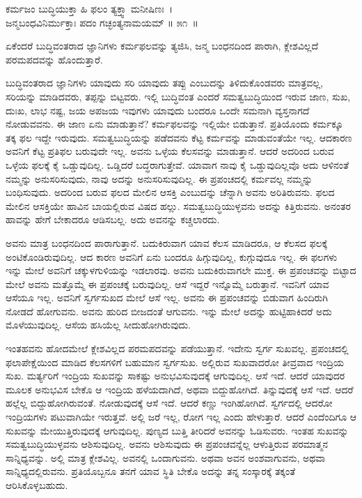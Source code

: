\begin{shloka}
ಕರ್ಮಜಂ ಬುದ್ಧಿಯುಕ್ತಾ ಹಿ ಫಲಂ ತ್ಯಕ್ತ್ವಾ ಮನೀಷಿಣಃ~।\\ಜನ್ಮಬಂಧವಿನಿರ್ಮುಕ್ತಾಃ ಪದಂ ಗಚ್ಛಂತ್ಯನಾಮಯಮ್ \hfill॥ ೫೧~॥
\end{shloka}

\begin{artha}
ಏಕೆಂದರೆ ಬುದ್ಧಿವಂತರಾದ ಜ್ಞಾನಿಗಳು ಕರ್ಮಫಲವನ್ನು ತ್ಯಜಿಸಿ, ಜನ್ಮ ಬಂಧನದಿಂದ ಪಾರಾಗಿ, ಕ್ಲೇಶವಿಲ್ಲದೆ ಪರಮಪದವನ್ನು ಹೊಂದುತ್ತಾರೆ.
\end{artha}

ಬುದ್ಧಿವಂತರಾದ ಜ್ಞಾನಿಗಳು ಯಾವುದು ಸರಿ ಯಾವುದು ತಪ್ಪು ಎಂಬುದನ್ನು ತಿಳಿದುಕೊಂಡವರು ಮಾತ್ರವಲ್ಲ, ಸರಿಯನ್ನು ಮಾಡಿದವರು, ತಪ್ಪನ್ನು ಬಿಟ್ಟವರು. ಇಲ್ಲಿ ಬುದ್ಧಿವಂತ ಎಂದರೆ ಸಮತ್ವಬುದ್ಧಿಯಿಂದ ಇರುವ ಜಾಣ, ಸುಖ, ದುಃಖ, ಲಾಭ ನಷ್ಟ, ಜಯ ಅಪಜಯ ಇವುಗಳು ಯಾವುದು ಬಂದರೂ ಒಂದೇ ಸಮನಾಗಿ ವ್ಯಸ್ತನಾಗದೆ ನೋಡುವವನು. ಈ ಜಾಣ ಏನು ಮಾಡುತ್ತಾನೆ? ಕರ್ಮಫಲವನ್ನು ಇಲ್ಲಿಯೇ ಬಿಡುತ್ತಾನೆ. ಪ್ರತಿಯೊಂದು ಕರ್ಮಕ್ಕೂ ತಕ್ಕ ಫಲ ಇದ್ದೇ ಇರುವುದು. ಸಮತ್ವಬುದ್ಧಿಯನ್ನು ಪಡೆದವನು ಕೆಟ್ಟ ಕರ್ಮವನ್ನು ಮಾಡುವಂತೆಯೇ ಇಲ್ಲ. ಆದಕಾರಣ ಅವನಿಗೆ ಕೆಟ್ಟ ಪ್ರತಿಫಲ ಬರುವುದೇ ಇಲ್ಲ. ಅವನು ಒಳ್ಳೆಯ ಕೆಲಸವನ್ನು ಮಾಡುತ್ತಾನೆ. ಆದರೆ ಅದರಿಂದ ಬರುವ ಒಳ್ಳೆಯ ಫಲಕ್ಕೆ ಕೈ ಒಡ್ಡುವುದಿಲ್ಲ. ಒಡ್ಡಿದರೆ ಬದ್ಧರಾಗುತ್ತೇವೆ. ಯಾವಾಗ ನಾವು ಕೈ ಒಡ್ಡುವುದಿಲ್ಲವೊ ಅದು ಆಳಿನಂತೆ ನಮ್ಮನ್ನು ಅನುಸರಿಸುವುದು, ನಾವು ಅದನ್ನು ಅನುಸರಿಸುವುದಿಲ್ಲ. ಈ ಪ್ರಪಂಚದಲ್ಲಿ ಕರ್ಮವಲ್ಲ ನಮ್ಮನ್ನು ಬಂಧಿಸುವುದು. ಅದರಿಂದ ಬರುವ ಫಲದ ಮೇಲಿನ ಆಸಕ್ತಿ ಎಂಬುದನ್ನು ಚೆನ್ನಾಗಿ ಅವನು ಅರಿತಿರುವನು. ಫಲದ ಮೇಲಿನ ಆಸಕ್ತಿಯೇ ಹಾವಿನ ಬಾಯಲ್ಲಿರುವ ವಿಷದ ಹಲ್ಲು. ಸಮತ್ವಬುದ್ಧಿಯುಳ್ಳವನು ಅದನ್ನು ಕಿತ್ತಿರುವನು. ಅನಂತರ ಹಾವನ್ನು ಹೇಗೆ ಬೇಕಾದರೂ ಆಡಿಸಬಲ್ಲ. ಅದು ಅವನನ್ನು ಕಚ್ಚಲಾರದು.

ಅವನು ಮಾತ್ರ ಬಂಧನದಿಂದ ಪಾರಾಗುತ್ತಾನೆ. ಬದುಕಿರುವಾಗ ಯಾವ ಕೆಲಸ ಮಾಡಿದರೂ, ಆ ಕೆಲಸದ ಫಲಕ್ಕೆ ಅಂಟಿಕೊಂಡಿರುವುದಿಲ್ಲ. ಆದ ಕಾರಣ ಅವನಿಗೆ ಏನು ಬಂದರೂ ಹಿಗ್ಗುವುದಿಲ್ಲ, ಕುಗ್ಗುವುದೂ ಇಲ್ಲ. ಈ ಫಲಗಳು ಇನ್ನು ಮೇಲೆ ಅವನಿಗೆ ಚಕ್ಕುಳಗುಳಿಯನ್ನು ಇಡಲಾರವು. ಅವನು ಬದುಕಿರುವಾಗಲೇ ಮುಕ್ತ. ಈ ಪ್ರಪಂಚವನ್ನು ಬಿಟ್ಟಾದ ಮೇಲೆ ಅವನು ಮತ್ತೊಮ್ಮೆ ಈ ಪ್ರಪಂಚಕ್ಕೆ ಬರುವುದಿಲ್ಲ. ಆಸೆ ಇದ್ದರೆ ಇನ್ನೊಮ್ಮೆ ಬರುತ್ತಾನೆ. ಇವನಿಗೆ ಯಾವ ಆಸೆಯೂ ಇಲ್ಲ. ಅವನಿಗೆ ಸ್ವರ್ಗಸುಖದ ಮೇಲೆ ಆಸೆ ಇಲ್ಲ. ಅವನು ಈ ಪ್ರಪಂಚವನ್ನು ಬಿಡುವಾಗ ಹಿಂದಿರುಗಿ ನೋಡದೆ ಹೋಗುವನು. ಅವನು ಹುರಿದ ಬೀಜದಂತೆ ಆಗುವನು. ಇನ್ನು ಮೇಲೆ ಅದನ್ನು ಹುಟ್ಟಿಹಾಕಿದರೆ ಅದು ಮೊಳೆಯುವುದಿಲ್ಲ. ಆಸೆಯ ಹಸಿಯೆಲ್ಲ ಸೀದುಹೋಗಿರುವುದು.

ಇಂತಹವನು ಹೋದಮೇಲೆ ಕ್ಲೇಶವಿಲ್ಲದ ಪರಮಪದವನ್ನು ಪಡೆಯುತ್ತಾನೆ. ಇದೇನು ಸ್ವರ್ಗ ಸುಖವಲ್ಲ. ಪ್ರಪಂಚದಲ್ಲಿ ಫಲಾಪೇಕ್ಷೆಯಿಂದ ಮಾಡಿದ ಕೆಲಸಗಳಿಗೆ ಬಹುಮಾನ ಸ್ವರ್ಗಸುಖ. ಅಲ್ಲಿರುವ ಸುಖವಾದರೋ ತೀವ್ರವಾದ ಇಂದ್ರಿಯ ಸುಖ. ಮರ್ತ್ಯರಿಗೆ ಇಂದ್ರಿಯ ಸುಖವನ್ನು ಸಾಕಷ್ಟು ಅನುಭವಿಸುವುದಕ್ಕೆ ಆಗುವುದಿಲ್ಲ. ಆಸೆ ಇದೆ. ಆದರೆ ಯಾವುದರ ಮೂಲಕ ಅನುಭವಿಸ ಬೇಕೊ ಆ ಇಂದ್ರಿಯ ಹಳೆಯದಾಗಿದೆ, ಅಥವಾ ಬಿದ್ದುಹೋಗಿದೆ. ತಿನ್ನುವುದಕ್ಕೆ ಆಸೆ ಇದೆ. ಆದರೆ ಹಲ್ಲೆಲ್ಲ ಬಿದ್ದುಹೋಗಿರುವಂತೆ. ನೋಡುವುದಕ್ಕೆ ಆಸೆ ಇದೆ. ಆದರೆ ಕಣ್ಣು ಇಂಗಿಹೋಗಿದೆ. ಸ್ವರ್ಗದಲ್ಲಿ ಆದರೋ ಇಂದ್ರಿಯಗಳು ಪಟುವಾಗಿಯೇ ಇರುತ್ತವೆ. ಅಲ್ಲಿ ಜರೆ ಇಲ್ಲ, ರೋಗ ಇಲ್ಲ ಎಂದು ಹೇಳುತ್ತಾರೆ. ಆದರೆ ಎಂದೆಂದಿಗೂ ಆ ಸುಖವನ್ನು ಮೇಯುತ್ತಿರುವುದಕ್ಕೆ ಆಗುವುದಿಲ್ಲ. ಪುಣ್ಯದ ಬುತ್ತಿ ತೀರಿದರೆ ಅವನನ್ನು ಓಡಿಸುವರು. ಇಂತಹ ಸುಖವನ್ನು ಸಮತ್ವಬುದ್ಧಿಯುಳ್ಳವನು ಆಶಿಸುವುದಿಲ್ಲ. ಅವನು ಆಶಿಸುವುದು ಈ ಪ್ರಪಂಚವನ್ನೆಲ್ಲ ಆಳುತ್ತಿರುವ ಪರಮಾತ್ಮನ ಸಾನ್ನಿಧ್ಯವನ್ನು. ಅಲ್ಲಿ ಮಾತ್ರ ಕ್ಲೇಶವಿಲ್ಲ. ಅವನಲ್ಲಿ ಒಂದಾಗುವನು. ಅಥವಾ ಅವನ ಅಂಶವಾಗುವನು, ಅಥವಾ ಸಾನ್ನಿಧ್ಯದಲ್ಲಿರುವನು. ಪ್ರತಿಯೊಬ್ಬನೂ ತನಗೆ ಯಾವ ಸ್ಥಿತಿ ಬೇಕೊ ಅದನ್ನು ತನ್ನ ಸಂಸ್ಕಾರಕ್ಕೆ ತಕ್ಕಂತೆ ಆರಿಸಿಕೊಳ್ಳಬಹುದು.

